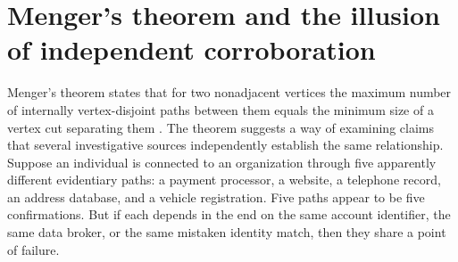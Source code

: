 \documentclass[11pt]{article}
\theoremstyle{definition}
\theoremstyle{remark}
\begin{document}
\section{Menger's theorem and the illusion of independent corroboration}

Menger's theorem states that for two nonadjacent vertices the maximum number of internally vertex-disjoint paths between them equals the minimum size of a vertex cut separating them \cite{menger1927,lavrov2026}. The theorem suggests a way of examining claims that several investigative sources independently establish the same relationship. Suppose an individual is connected to an organization through five apparently different evidentiary paths: a payment processor, a website, a telephone record, an address database, and a vehicle registration. Five paths appear to be five confirmations. But if each depends in the end on the same account identifier, the same data broker, or the same mistaken identity match, then they share a point of failure.
\end{document}
